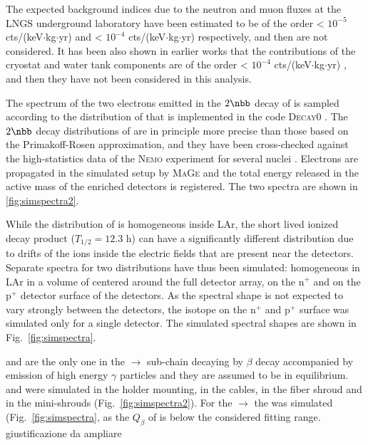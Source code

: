 The expected background indices due to the neutron and muon fluxes at the LNGS underground laboratory have been estimated to be of the order < $10^{-5}$ cts/(keV$\cdot$kg$\cdot$yr) \cite{neutronsBI} and < $10^{-4}$ cts/(keV$\cdot$kg$\cdot$yr) \cite{muonsBI} respectively, and then are not considered. It has been also shown in earlier works that the contributions of the cryostat and water tank components are of the order < $10^{-4}$ cts/(keV$\cdot$kg$\cdot$yr) \cite{criowaterBI}, and then they have not been considered in this analysis.

\marginnote{$2\nbb$} The spectrum of the two electrons emitted in the $2\nbb$ decay of  is sampled according to the distribution of \cite{tables2nbb} that is implemented in the code \textsc{Decay0} \cite{decay0}. The $2\nbb$ decay distributions of \cite{tables2nbb} are in principle more precise than those based on the Primakoff-Rosen approximation, and they have been cross-checked against the high-statistics data of the \textsc{Nemo} experiment for several nuclei \cite{nemo1,nemo2,nemo3,nemo4,nemo5}. Electrons are propagated in the {\gerda} simulated setup by \textsc{MaGe} and the total energy released in the active mass of the enriched detectors is registered. The two spectra are shown in \ref{fig:simspectra2}.

 While the distribution of  is homogeneous inside LAr, the short lived ionized decay product  ($T_{1/2} = 12.3$ h) can have a significantly different distribution due to drifts of the  ions inside the electric fields that are present near the detectors. Separate spectra for two  distributions have thus been simulated: homogeneous in LAr in a volume of centered around the full detector array, on the n$^+$ and on the p$^+$ detector surface of the detectors. As the spectral shape is not expected to vary strongly between the detectors, the isotope on the n$^+$ and p$^+$ surface was simulated only for a single detector. The simulated spectral shapes are shown in Fig.~\ref{fig:simspectra}.

  and  are the only one in the  $\rightarrow$  sub-chain decaying by $\beta$ decay accompanied by emission of high energy $\gamma$ particles and they are assumed to be in equilibrium.  and  were simulated in the holder mounting, in the cables, in the fiber shroud and in the mini-shrouds (Fig.~\ref{fig:simspectra2}). For the  $\rightarrow$  the  was simulated (Fig.~\ref{fig:simspectra}, as the $Q_\beta$ of  is below the considered fitting range. {\color{red}giustificazione da ampliare}

